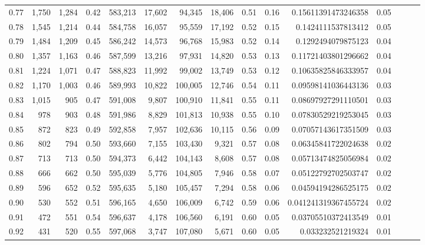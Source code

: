 \begin{tabular}{rrrrrrrrrrrrrrr}
0.77 &   1,750 &  1,284 &  0.42 &  583,213 &   17,602 &   94,345 &   18,406 &  0.51 &  0.16 &   0.15611391473246358 &      0.05 \\
0.78 &   1,545 &  1,214 &  0.44 &  584,758 &   16,057 &   95,559 &   17,192 &  0.52 &  0.15 &    0.1424111537813412 &      0.05 \\
0.79 &   1,484 &  1,209 &  0.45 &  586,242 &   14,573 &   96,768 &   15,983 &  0.52 &  0.14 &    0.1292494079875123 &      0.04 \\
0.80 &   1,357 &  1,163 &  0.46 &  587,599 &   13,216 &   97,931 &   14,820 &  0.53 &  0.13 &   0.11721403801296662 &      0.04 \\
0.81 &   1,224 &  1,071 &  0.47 &  588,823 &   11,992 &   99,002 &   13,749 &  0.53 &  0.12 &   0.10635825846333957 &      0.04 \\
0.82 &   1,170 &  1,003 &  0.46 &  589,993 &   10,822 &  100,005 &   12,746 &  0.54 &  0.11 &   0.09598141036443136 &      0.03 \\
0.83 &   1,015 &    905 &  0.47 &  591,008 &    9,807 &  100,910 &   11,841 &  0.55 &  0.11 &   0.08697927291110501 &      0.03 \\
0.84 &     978 &    903 &  0.48 &  591,986 &    8,829 &  101,813 &   10,938 &  0.55 &  0.10 &   0.07830529219253045 &      0.03 \\
0.85 &     872 &    823 &  0.49 &  592,858 &    7,957 &  102,636 &   10,115 &  0.56 &  0.09 &   0.07057143617351509 &      0.03 \\
0.86 &     802 &    794 &  0.50 &  593,660 &    7,155 &  103,430 &    9,321 &  0.57 &  0.08 &   0.06345841722024638 &      0.02 \\
0.87 &     713 &    713 &  0.50 &  594,373 &    6,442 &  104,143 &    8,608 &  0.57 &  0.08 &   0.05713474825056984 &      0.02 \\
0.88 &     666 &    662 &  0.50 &  595,039 &    5,776 &  104,805 &    7,946 &  0.58 &  0.07 &   0.05122792702503747 &      0.02 \\
0.89 &     596 &    652 &  0.52 &  595,635 &    5,180 &  105,457 &    7,294 &  0.58 &  0.06 &   0.04594194286525175 &      0.02 \\
0.90 &     530 &    552 &  0.51 &  596,165 &    4,650 &  106,009 &    6,742 &  0.59 &  0.06 &  0.041241319367455724 &      0.02 \\
0.91 &     472 &    551 &  0.54 &  596,637 &    4,178 &  106,560 &    6,191 &  0.60 &  0.05 &   0.03705510372413549 &      0.01 \\
0.92 &     431 &    520 &  0.55 &  597,068 &    3,747 &  107,080 &    5,671 &  0.60 &  0.05 &     0.033232521219324 &      0.01 \\

\end{tabular}
